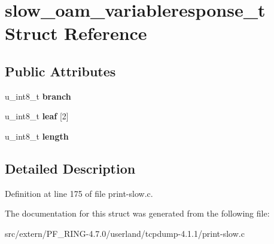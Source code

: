 \hypertarget{structslow__oam__variableresponse__t}{
\section{slow\_\-oam\_\-variableresponse\_\-t Struct Reference}
\label{structslow__oam__variableresponse__t}
}
\subsection*{Public Attributes}
\begin{DoxyCompactItemize}
\item 
\hypertarget{structslow__oam__variableresponse__t_ae70a11e45cc25afb176eb04b6134a444}{
u\_\-int8\_\-t {\bfseries branch}}
\label{structslow__oam__variableresponse__t_ae70a11e45cc25afb176eb04b6134a444}

\item 
\hypertarget{structslow__oam__variableresponse__t_af65092b7d00ee15f1bc43758d5f76293}{
u\_\-int8\_\-t {\bfseries leaf} \mbox{[}2\mbox{]}}
\label{structslow__oam__variableresponse__t_af65092b7d00ee15f1bc43758d5f76293}

\item 
\hypertarget{structslow__oam__variableresponse__t_a36521dd2a73e2539dfb7d540b014de34}{
u\_\-int8\_\-t {\bfseries length}}
\label{structslow__oam__variableresponse__t_a36521dd2a73e2539dfb7d540b014de34}

\end{DoxyCompactItemize}


\subsection{Detailed Description}


Definition at line 175 of file print-\/slow.c.



The documentation for this struct was generated from the following file:\begin{DoxyCompactItemize}
\item 
src/extern/PF\_\-RING-\/4.7.0/userland/tcpdump-\/4.1.1/print-\/slow.c\end{DoxyCompactItemize}
